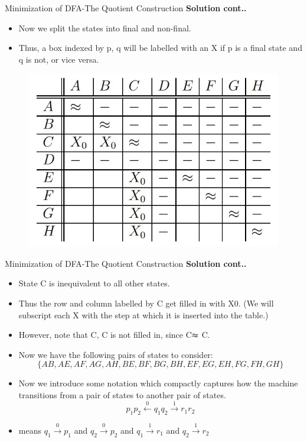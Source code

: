 \documentclass{beamer}
\begin{document}
\begin{frame}{Minimization of DFA-The Quotient Construction}
	\textbf{Solution cont..}
	\begin{itemize}
		\item Now we split the states into final and non-final. 
		\item Thus, a box indexed by
		p, q will be labelled with an X if p is a final state and q is not, or vice versa.
	\end{itemize}
	\begin{figure}
		\includegraphics[scale=.5]{img2/m15}
	\end{figure}

\end{frame}
\begin{frame}{Minimization of DFA-The Quotient Construction}
	\textbf{Solution cont..}
	\begin{itemize}
		\item State C is inequivalent to all other states.
		\item Thus the row and column labelled by C get filled in with X0. (We will subscript each X with the step
		at which it is inserted into the table.)
		\item However, note that C, C is not filled
		in, since C$ \thickapprox $ C.
		\item Now we have the following pairs of states to consider:
		$$\{AB, AE, AF, AG, AH, BE, BF, BG, BH, EF, EG, EH, F G, F H, GH\}
$$
	\end{itemize}
\begin{itemize}
	\item Now we introduce some notation which compactly captures how the machine transitions from a pair of states to another pair of states. 
	$$p_1p_2 \xleftarrow{0} q_1q_2\xrightarrow{1}r_1r_2$$
\end{itemize}
\begin{itemize}
	\item means $q_1\xrightarrow{0} p_1$ and $q_2\xrightarrow{0}p_2$ and $q_1\xrightarrow{1}r_1$ and $q_2 \xrightarrow{1} r_2$
\end{itemize}
\end{frame}
\end{document}
